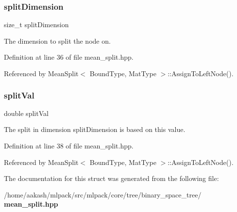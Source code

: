 \subsubsection{split\+Dimension}
{\footnotesize\ttfamily size\+\_\+t split\+Dimension}



The dimension to split the node on. 



Definition at line 36 of file mean\+\_\+split.\+hpp.



Referenced by Mean\+Split$<$ Bound\+Type, Mat\+Type $>$\+::\+Assign\+To\+Left\+Node().

\mbox{\label{structmlpack_1_1tree_1_1MeanSplit_1_1SplitInfo_a414b35a0916562712a643bf4aa7904dd}} 
\subsubsection{split\+Val}
{\footnotesize\ttfamily double split\+Val}



The split in dimension split\+Dimension is based on this value. 



Definition at line 38 of file mean\+\_\+split.\+hpp.



Referenced by Mean\+Split$<$ Bound\+Type, Mat\+Type $>$\+::\+Assign\+To\+Left\+Node().



The documentation for this struct was generated from the following file\+:\begin{DoxyCompactItemize}
\item 
/home/aakash/mlpack/src/mlpack/core/tree/binary\+\_\+space\+\_\+tree/\textbf{ mean\+\_\+split.\+hpp}\end{DoxyCompactItemize}

